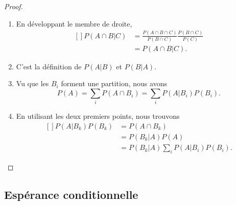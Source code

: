 \begin{proof}
    \begin{enumerate}
        \item
            En développant le membre de droite,
            \begin{equation}
                \begin{aligned}[]
                    P(A\cap B|C)&=\frac{ P(A\cap B\cap C) }{ P(B\cap C) }\frac{ P(B\cap C) }{ P(C) }\\
                    &=P(A\cap B|C).
                \end{aligned}
            \end{equation}
        \item
            C'est la définition de \( P(A|B)\) et \( P(B|A)\).
        \item
            Vu que les \( B_i\) forment une partition, nous avons
            \begin{equation}
                P(A)=\sum_iP(A\cap B_i)=\sum_iP(A|B_i)P(B_i).
            \end{equation}
        \item
            En utilisant les deux premiers points, nous trouvons
            \begin{equation}
                \begin{aligned}[]
                    P(A|B_k)P(B_k)&=P(A\cap B_k)\\
                    &=P(B_k|A)P(A)\\
                    &=P(B_k|A)\sum_iP(A|B_i)P(B_i).
                \end{aligned}
            \end{equation}
    \end{enumerate}
\end{proof}

\subsection{Espérance conditionnelle}

